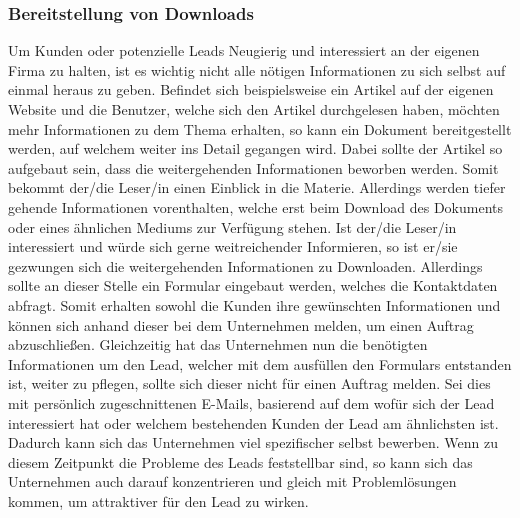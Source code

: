 \subsubsection{Bereitstellung von Downloads}
Um Kunden oder potenzielle Leads Neugierig und interessiert an der eigenen Firma zu halten, ist es wichtig nicht alle nötigen Informationen zu sich selbst auf einmal heraus zu geben. 
\newline 
Befindet sich beispielsweise ein Artikel auf der eigenen Website und die Benutzer, welche sich den Artikel durchgelesen haben, möchten mehr Informationen zu dem Thema erhalten, so kann ein Dokument bereitgestellt werden, auf welchem weiter ins Detail gegangen wird. Dabei sollte der Artikel so aufgebaut sein, dass die weitergehenden Informationen beworben werden. Somit bekommt der/die Leser/in einen Einblick in die Materie. Allerdings werden tiefer gehende Informationen vorenthalten, welche erst beim Download des Dokuments oder eines ähnlichen Mediums zur Verfügung stehen.
\newline 
Ist der/die Leser/in interessiert und würde sich gerne weitreichender Informieren, so ist er/sie gezwungen sich die weitergehenden Informationen zu Downloaden. Allerdings sollte an dieser Stelle ein Formular eingebaut werden, welches die Kontaktdaten abfragt. Somit erhalten sowohl die Kunden ihre gewünschten Informationen und können sich anhand dieser bei dem Unternehmen melden, um einen Auftrag abzuschließen. Gleichzeitig hat das Unternehmen nun die benötigten Informationen um den Lead, welcher mit dem ausfüllen den Formulars entstanden ist, weiter zu pflegen, sollte sich dieser nicht für einen Auftrag melden. Sei dies mit persönlich zugeschnittenen E-Mails, basierend auf dem wofür sich der Lead interessiert hat oder welchem bestehenden Kunden der Lead am ähnlichsten ist. Dadurch kann sich das Unternehmen viel spezifischer selbst bewerben. Wenn zu diesem Zeitpunkt die Probleme des Leads feststellbar sind, so kann sich das Unternehmen auch darauf konzentrieren und gleich mit Problemlösungen kommen, um attraktiver für den Lead zu wirken.

